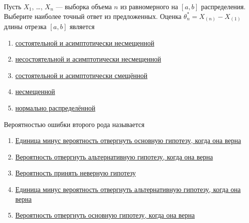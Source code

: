 \documentclass[t]{beamer}
\begin{document}
 \begin{frame} \label{7} 
\begin{block}{7} 

Пусть $X_1$, \ldots, $X_n$ — выборка объема $n$ из равномерного на $[a, b]$ распределения. Выберите наиболее точный ответ из предложенных. Оценка $\theta^*_n = X_{(n)}-X_{(1)}$ длины отрезка $[a,b]$ является
 


 \end{block} 
\begin{enumerate} 
\item[] \hyperlink{7-Yes}{\beamergotobutton{} состоятельной и асимптотически несмещенной}
\item[] \hyperlink{7-No}{\beamergotobutton{} несостоятельной и асимптотически несмещенной}
\item[] \hyperlink{7-No}{\beamergotobutton{} состоятельной и асимптотически смещённой}
\item[] \hyperlink{7-No}{\beamergotobutton{} несмещенной}
\item[] \hyperlink{7-No}{\beamergotobutton{} нормально распределённой}
\end{enumerate} 
\end{frame} 


 \begin{frame} \label{8} 
\begin{block}{8} 

Вероятностью ошибки второго рода называется
 


 \end{block} 
\begin{enumerate} 
\item[] \hyperlink{8-No}{\beamergotobutton{} Единица минус  вероятность отвергнуть основную гипотезу, когда она верна}
\item[] \hyperlink{8-Yes}{\beamergotobutton{} Вероятность отвергнуть альтернативную гипотезу, когда она верна}
\item[] \hyperlink{8-No}{\beamergotobutton{} Вероятность принять неверную гипотезу}
\item[] \hyperlink{8-No}{\beamergotobutton{} Единица минус  вероятность отвергнуть альтернативную гипотезу, когда она верна}
\item[] \hyperlink{8-No}{\beamergotobutton{} Вероятность отвергнуть основную гипотезу, когда она верна}
\end{enumerate} 
\end{frame} 
\end{document}

